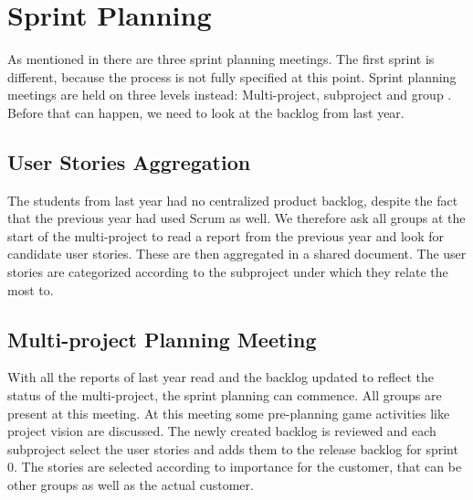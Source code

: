 \chapter{Sprint Planning}\label{chap:sprint1_planning}

As mentioned in  there are three sprint planning meetings. The first sprint is different, because the process is not fully specified at this point. Sprint planning meetings are held on three levels instead: Multi-project, subproject and group . Before that can happen, we need to look at the backlog from last year.

\section{User Stories Aggregation}

The students from last year had no centralized product backlog, despite the fact that the previous year had used Scrum as well. We therefore ask all groups at the start of the multi-project to read a report from the previous year and look for candidate user stories. These are then aggregated in a shared document. The user stories are categorized according to the subproject under which they relate the most to.

\section{Multi-project Planning Meeting}
With all the reports of last year read and the backlog updated to reflect the status of the multi-project, the sprint planning can commence. All groups are present at this meeting. At this meeting some pre-planning game activities like project vision are discussed. The newly created backlog is reviewed and each subproject select the user stories and adds them to the release backlog for sprint 0. The stories are selected according to importance for the customer, that can be other groups as well as the actual customer.


